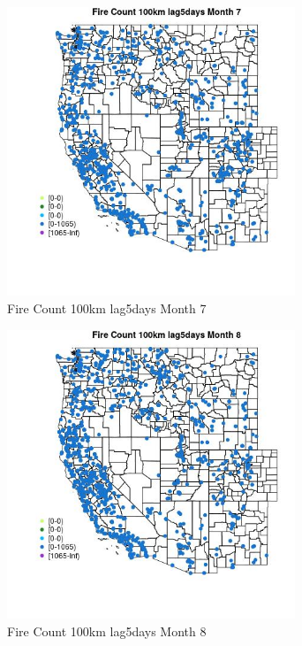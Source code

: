 \begin{figure} 
\centering  
\includegraphics[width=0.77\textwidth]{Code_Outputs/Report_ML_input_PM25_Step4_part_f_de_duplicated_aveswNAs_MapObsMo7Fire_Count_100km_lag5days.jpg} 
\caption{\label{fig:Report_ML_input_PM25_Step4_part_f_de_duplicated_aveswNAsMapObsMo7Fire_Count_100km_lag5days}Fire Count 100km lag5days Month 7} 
\end{figure} 
 

\begin{figure} 
\centering  
\includegraphics[width=0.77\textwidth]{Code_Outputs/Report_ML_input_PM25_Step4_part_f_de_duplicated_aveswNAs_MapObsMo8Fire_Count_100km_lag5days.jpg} 
\caption{\label{fig:Report_ML_input_PM25_Step4_part_f_de_duplicated_aveswNAsMapObsMo8Fire_Count_100km_lag5days}Fire Count 100km lag5days Month 8} 
\end{figure} 
 

